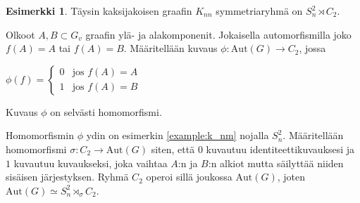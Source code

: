 \documentclass[a4paper, 12pt]{article}
\theoremstyle{definition}
\newtheorem{example}[mydef]{Esimerkki}
\theoremstyle{plain}
\begin{document}
\begin{example}
Täysin kaksijakoisen graafin $K_{nn}$ symmetriaryhmä on $ S_n^2 \rtimes C_2 $.

\begin{center}
\end{center}

Olkoot $A, B \subset G_v$ graafin ylä- ja alakomponenit. Jokaisella automorfismilla joko $f(A) = A$ tai $f(A) = B$. Määritellään kuvaus $\phi: \mathrm{Aut}(G) \rightarrow C_2$, jossa
\begin{center}
\begin{math}
\phi(f) =
\left\{
	\begin{array}{ll}
		0  & \mbox{jos } f(A) = A \\
		1 & \mbox{jos } f(A) = B
	\end{array}
\right.
\end{math}
\end{center}
Kuvaus $\phi$ on selvästi homomorfismi.

Homomorfismin $\phi$ ydin on esimerkin \ref{example:k_nm} nojalla $S_n^2$. Määritellään homomorfismi $\sigma: C_2 \rightarrow \mathrm{Aut}(G)$ siten, että $0$ kuvautuu identiteettikuvauksesi ja $1$ kuvautuu kuvaukseksi, joka vaihtaa $A$:n ja $B$:n alkiot mutta säilyttää niiden sisäisen järjestyksen. Ryhmä $C_2$ operoi sillä joukossa $\mathrm{Aut}(G)$, joten $\mathrm{Aut}(G) \simeq S_n^2 \rtimes_\sigma C_2$.
\end{example}
\end{document}
